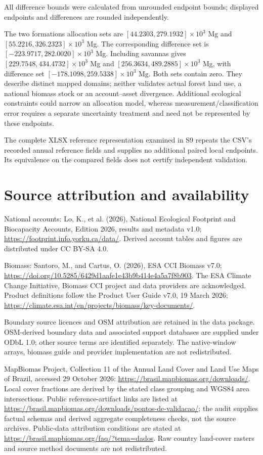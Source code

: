\documentclass[11pt,a4paper]{article}
\begin{document}
All difference bounds were calculated from unrounded endpoint bounds; displayed endpoints and differences are rounded independently.

The two formations allocation sets are $[44.2303,279.1932]\times10^3$ Mg and $[55.2216,326.2323]\times10^3$ Mg. The corresponding difference set is $[-223.9717,282.0020]\times10^3$ Mg. Including savannas gives $[229.7548,434.4732]\times10^3$ Mg and $[256.3634,489.2885]\times10^3$ Mg, with difference set $[-178.1098,259.5338]\times10^3$ Mg. Both sets contain zero. They describe distinct mapped domains; neither validates actual forest land use, a national biomass stock or an account--asset divergence. Additional ecological constraints could narrow an allocation model, whereas measurement/classification error requires a separate uncertainty treatment and need not be represented by these endpoints.

The complete XLSX reference representation examined in S9 repeats the CSV's recorded annual reference fields and supplies no additional paired local endpoints. Its equivalence on the compared fields does not certify independent validation.



\section*{Source attribution and availability}

National accounts: Lo, K., et al. (2026), National Ecological Footprint and Biocapacity Accounts, Edition 2026, results and metadata v1.0; \url{https://footprint.info.yorku.ca/data/}. Derived account tables and figures are distributed under CC BY-SA 4.0.

Biomass: Santoro, M., and Cartus, O. (2026), ESA CCI Biomass v7.0; \url{https://doi.org/10.5285/6429d1aafe1e43b9b414e4a5a7f8b903}. The ESA Climate Change Initiative, Biomass CCI project and data providers are acknowledged. Product definitions follow the Product User Guide v7.0, 19 March 2026; \url{https://climate.esa.int/en/projects/biomass/key-documents/}.

Boundary source licences and OSM attribution are retained in the data package. OSM-derived boundary data and associated support databases are supplied under ODbL 1.0; other source terms are identified separately. The native-window arrays, biomass guide and provider implementation are not redistributed.

MapBiomas Project, Collection 11 of the Annual Land Cover and Land Use Maps of Brazil, accessed 29 October 2026: \url{https://brasil.mapbiomas.org/downloads/}. Local cover fractions are derived by the stated class grouping and WGS84 area intersections. Public reference-artifact links are listed at \url{https://brasil.mapbiomas.org/downloads/pontos-de-validacao/}; the audit supplies factual schemas and derived aggregate completeness checks, not the source archives. Public-data attribution conditions are stated at \url{https://brasil.mapbiomas.org/faq/?tema=dados}. Raw country land-cover rasters and source method documents are not redistributed.
\end{document}
